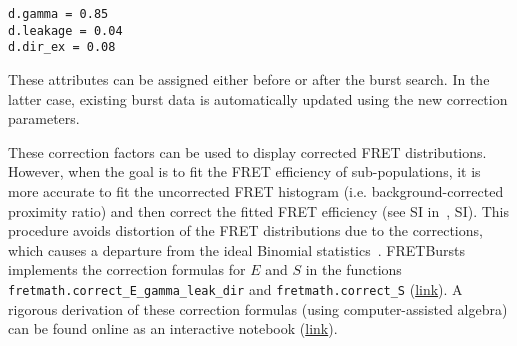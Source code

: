 \begin{lstlisting}
d.gamma = 0.85
d.leakage = 0.04
d.dir_ex = 0.08
\end{lstlisting}

These attributes can be assigned either before or after the burst search. In the
latter case, existing burst data is automatically updated using the new
correction parameters.

These correction factors can be used to display corrected FRET distributions.
However, when the goal is to fit the FRET efficiency of sub-populations, 
it is more accurate to fit the uncorrected FRET histogram (i.e. background-corrected
proximity ratio) and then correct the fitted FRET efficiency (see SI in~\cite{Lee_2005}, SI).
This procedure avoids 
distortion of the FRET distributions due to the corrections, which causes
a departure from the ideal Binomial statistics~\cite{Gopich_2007}.
FRETBursts implements the correction formulas for $E$ and $S$ in the functions
\verb|fretmath.correct_E_gamma_leak_dir| and \verb|fretmath.correct_S|
(\href{http://fretbursts.readthedocs.org/en/latest/fretmath.html}{link}). 
A rigorous derivation of these correction formulas (using computer-assisted algebra) 
can be found online as an interactive notebook (\href{http://nbviewer.jupyter.org/github/tritemio/notebooks/blob/master/Derivation%20of%20FRET%20and%20S%20correction%20formulas.ipynb}{link}).

